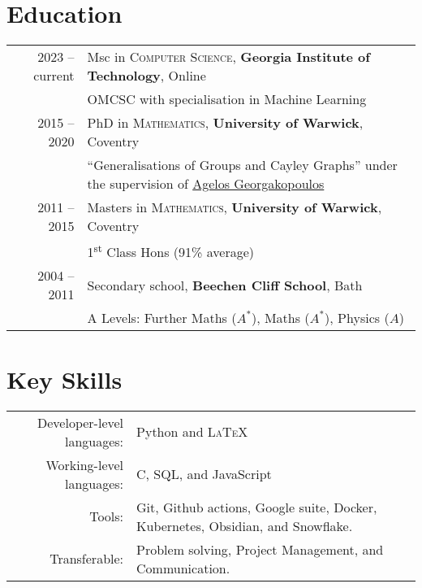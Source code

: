 \documentclass[a4paper,10pt]{article}
\begin{document}
\section{Education}
\begin{tabular}{rl}
	\textsc{} 2023 -- current & Msc in \textsc{Computer Science}, \textbf{Georgia Institute of Technology}, Online\\
	& OMCSC with specialisation in Machine Learning\\
	\textsc{} 2015 -- 2020 & PhD in \textsc{Mathematics}, \textbf{University of Warwick}, Coventry\\
	& ``Generalisations of Groups and Cayley Graphs'' under the supervision of \href{https://homepages.warwick.ac.uk/~maslar/}{Agelos Georgakopoulos}\\
	\textsc{} 2011 -- 2015& Masters in \textsc{Mathematics}, \textbf{University of Warwick}, Coventry\\
	& 1\textsuperscript{st} Class Hons (91\% average)\\
	\textsc{} 2004 -- 2011& Secondary school, \textbf{Beechen Cliff School}, Bath\\
	&  A Levels: Further Maths ($A^{\ast}$), Maths ($A^{\ast}$), Physics ($A$)
\end{tabular}

\vspace{-0.05 in}

\section{Key Skills}
\begin{tabular}{rl}
	Developer-level languages: &  Python and \textsc{LaTeX}\\
	Working-level languages: & C, SQL, and JavaScript\\
	Tools: & Git, Github actions, Google suite, Docker, Kubernetes, Obsidian, and Snowflake.\\
	Transferable: & Problem solving, Project Management, and Communication.\\
\end{tabular}
\vspace{-0.05 in}
\end{document}
